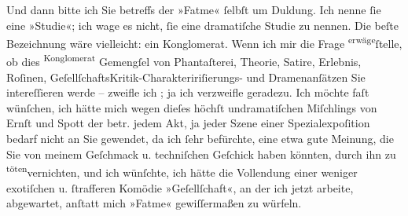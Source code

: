 \pstart
           Und dann bitte ich Sie \introOben{}betreffs\introOben{} der »Fatme«{ }ſelbſt  um Duldung.
               Ich nenne{ }ſie eine »Studie«; ich wage es nicht,{ }ſie eine dramatiſche Studie zu
               nennen. Die beſte Bezeichnung wäre vielleicht: ein Konglomerat. Wenn ich \introOben{}mir\introOben{} die Frage \substVorne{}\textsuperscript{erwäge}\substDazwischen{}ſtelle\substHinten{}, ob dies \substVorne{}\textsuperscript{Konglomerat}\substDazwischen{} Gemengſel\substHinten{} von  Phantaſterei, \introOben{}Theorie, \introOben{}{ }Satire, \introOben{}Erlebnis\introOben{}, Roſinen,
                  \introOben{}Geſellſchafts\introOben{}Kritik-\introOben{}Charakteririſierungs-\introOben{} und Dramenanſätzen Sie intereſſieren werde –  zweifle ich ; ja ich verzweifle geradezu. Ich möchte
               faſt wünſchen, ich hätte mich \introOben{}wegen\introOben{} dieſes \introOben{}höchſt undramatiſchen\introOben{} Miſchlings von Ernſt und Spott \introOben{}der betr.  jedem Akt, ja jeder Szene  einer
                  Spezialexpoſition  bedarf\introOben{}{ } nicht an Sie gewendet, da ich{ }ſehr befürchte,
               eine etwa gute Meinung, die Sie von meinem Geſchmack \introOben{}u.
                  techniſchen Geſchick\introOben{} haben könnten, durch
                  \introOben{}ihn\introOben{} zu \substVorne{}\textsuperscript{töten}\substDazwischen{}vernichten\substHinten{}, und ich wünſchte, ich hätte die Vollendung einer \introOben{}weniger
                  exotiſchen u.{ }ſtrafferen\introOben{} Komödie »Geſellſchaft«, an der ich jetzt arbeite, abgewartet, anſtatt mich »Fatme« \introOben{}gewiſſermaßen\introOben{} zu
               würfeln.\pend
           
